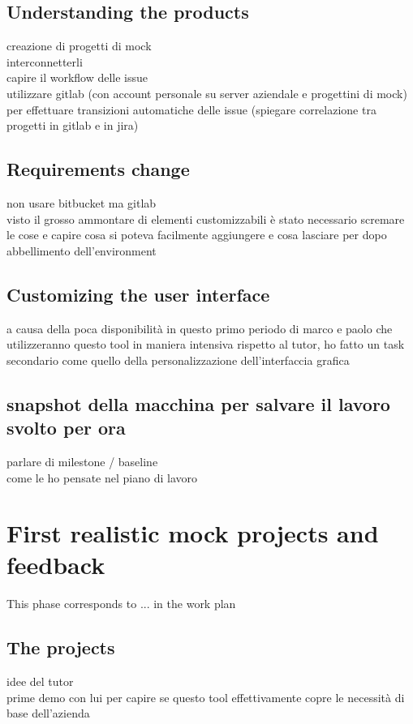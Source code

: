 	\subsection{Understanding the products}
		creazione di progetti di mock\\
		interconnetterli\\
		capire il workflow delle issue\\
		utilizzare gitlab (con account personale su server aziendale e progettini di mock) per effettuare transizioni automatiche delle issue (spiegare correlazione tra progetti in gitlab e in jira)

	\subsection{Requirements change}
		non usare bitbucket ma gitlab\\
		visto il grosso ammontare di elementi customizzabili è stato necessario scremare le cose e capire cosa si poteva facilmente aggiungere e cosa lasciare per dopo\\
		abbellimento dell'environment
		

	\subsection{Customizing the user interface}
		a causa della poca disponibilità in questo primo periodo di marco e paolo che utilizzeranno questo tool in maniera intensiva rispetto al tutor, ho fatto un task secondario come quello della personalizzazione dell'interfaccia grafica
	
	
	\subsection{snapshot della macchina per salvare il lavoro svolto per ora}
		parlare di milestone / baseline\\
		come le ho pensate nel piano di lavoro

\section{First realistic mock projects and feedback}

	This phase corresponds to ... in the work plan

	\subsection{The projects}
		idee del tutor\\
		prime demo con lui per capire se questo tool effettivamente copre le necessità di base dell'azienda
		
